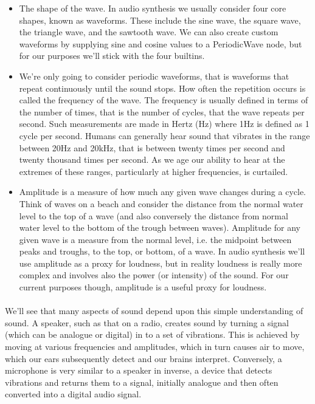 \begin{itemize}
\item The shape of the wave. In audio synthesis we usually consider four core shapes, known as waveforms. These include the sine wave, the square wave, the triangle wave, and the sawtooth wave. We can also create custom waveforms by supplying sine and cosine values to a PeriodicWave node, but for our purposes we'll stick with the four builtins.
\item We're only going to consider periodic waveforms, that is waveforms that repeat continuously until the sound stops. How often the repetition occurs is called the frequency of the wave. The frequency is usually defined in terms of the number of times, that is the number of cycles, that the wave repeats per second. Such measurements are made in Hertz (Hz) where 1Hz is defined as 1 cycle per second. Humans can generally hear sound that vibrates in the range between 20Hz and 20kHz, that is between twenty times per second and twenty thousand times per second. As we age our ability to hear at the extremes of these ranges, particularly at higher frequencies, is curtailed.
\item Amplitude is a measure of how much any given wave changes during a cycle. Think of waves on a beach and consider the distance from the normal water level to the top of a wave (and also conversely the distance from normal water level to the bottom of the trough between waves). Amplitude for any given wave is a measure from the normal level, i.e. the midpoint between peaks and troughs, to the top, or bottom, of a wave. In audio synthesis we'll use amplitude as a proxy for loudness, but in reality loudness is really more complex and involves also the power (or intensity) of the sound. For our current purposes though, amplitude is a useful proxy for loudness.
\end{itemize}

\paragraph{} We'll see that many aspects of sound depend upon this simple understanding of sound. A speaker, such as that on a radio, creates sound by turning a signal (which can be analogue or digital) in to a set of vibrations. This is achieved by moving at various frequencies and amplitudes, which in turn causes air to move, which our ears subsequently detect and our brains interpret. Conversely, a microphone is very similar to a speaker in inverse, a device that detects vibrations and returns them to a signal, initially analogue and then often converted into a digital audio signal. 
